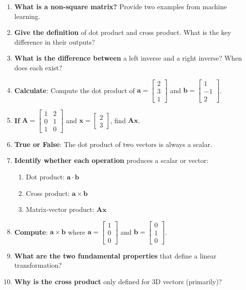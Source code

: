 \documentclass[12pt,a4paper]{article}
\theoremstyle{definition}
\begin{document}
\begin{enumerate}
\item \textbf{What is a non-square matrix?} Provide two examples from machine learning.

\item \textbf{Give the definition} of dot product and cross product. What is the key difference in their outputs?

\item \textbf{What is the difference between} a left inverse and a right inverse? When does each exist?

\item \textbf{Calculate}: Compute the dot product of $\mathbf{a} = \begin{bmatrix} 2 \\ 3 \\ 1 \end{bmatrix}$ and $\mathbf{b} = \begin{bmatrix} 1 \\ -1 \\ 2 \end{bmatrix}$.

\item \textbf{If} $\mathbf{A} = \begin{bmatrix} 1 & 2 \\ 0 & 1 \\ 1 & 0 \end{bmatrix}$ and $\mathbf{x} = \begin{bmatrix} 2 \\ 3 \end{bmatrix}$, find $\mathbf{Ax}$.

\item \textbf{True or False}: The dot product of two vectors is always a scalar.

\item \textbf{Identify whether each operation} produces a scalar or vector:
\begin{enumerate}[label=(\alph*)]
\item Dot product: $\mathbf{a} \cdot \mathbf{b}$
\item Cross product: $\mathbf{a} \times \mathbf{b}$
\item Matrix-vector product: $\mathbf{A}\mathbf{x}$
\end{enumerate}

\item \textbf{Compute}: $\mathbf{a} \times \mathbf{b}$ where $\mathbf{a} = \begin{bmatrix} 1 \\ 0 \\ 0 \end{bmatrix}$ and $\mathbf{b} = \begin{bmatrix} 0 \\ 1 \\ 0 \end{bmatrix}$.

\item \textbf{What are the two fundamental properties} that define a linear transformation?

\item \textbf{Why is the cross product} only defined for 3D vectors (primarily)?
\end{enumerate}
\end{document}
